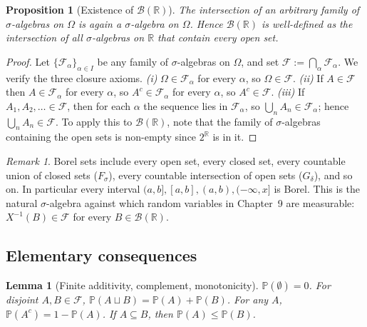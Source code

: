 \documentclass[11pt]{article}
\newtheorem{lemma}[theorem]{Lemma}
\newtheorem{proposition}[theorem]{Proposition}
\theoremstyle{remark}
\newtheorem{remark}[theorem]{Remark}
\begin{document}
\begin{proposition}[Existence of $\mathcal{B}(\mathbb{R})$]
\label{prop:borel-exists}
The intersection of an arbitrary family of $\sigma$-algebras on $\Omega$ is again a $\sigma$-algebra on $\Omega$. Hence $\mathcal{B}(\mathbb{R})$ is well-defined as the intersection of all $\sigma$-algebras on $\mathbb{R}$ that contain every open set.
\end{proposition}

\begin{proof}
Let $\{\mathcal{F}_\alpha\}_{\alpha \in I}$ be any family of $\sigma$-algebras on $\Omega$, and set $\mathcal{F} := \bigcap_{\alpha} \mathcal{F}_\alpha$. We verify the three closure axioms. \emph{(i)} $\Omega \in \mathcal{F}_\alpha$ for every $\alpha$, so $\Omega \in \mathcal{F}$. \emph{(ii)} If $A \in \mathcal{F}$ then $A \in \mathcal{F}_\alpha$ for every $\alpha$, so $A^c \in \mathcal{F}_\alpha$ for every $\alpha$, so $A^c \in \mathcal{F}$. \emph{(iii)} If $A_1, A_2, \ldots \in \mathcal{F}$, then for each $\alpha$ the sequence lies in $\mathcal{F}_\alpha$, so $\bigcup_n A_n \in \mathcal{F}_\alpha$; hence $\bigcup_n A_n \in \mathcal{F}$. To apply this to $\mathcal{B}(\mathbb{R})$, note that the family of $\sigma$-algebras containing the open sets is non-empty since $2^\mathbb{R}$ is in it.
\end{proof}

\begin{remark}
Borel sets include every open set, every closed set, every countable union of closed sets ($F_\sigma$), every countable intersection of open sets ($G_\delta$), and so on. In particular every interval $(a, b], [a, b], (a, b), (-\infty, x]$ is Borel. This is the natural $\sigma$-algebra against which random variables in Chapter~9 are measurable: $X^{-1}(B) \in \mathcal{F}$ for every $B \in \mathcal{B}(\mathbb{R})$.
\end{remark}

\subsection*{Elementary consequences}

\begin{lemma}[Finite additivity, complement, monotonicity]
\label{lem:basic}
$\mathbb{P}(\emptyset) = 0$. For disjoint $A, B \in \mathcal{F}$, $\mathbb{P}(A \sqcup B) = \mathbb{P}(A) + \mathbb{P}(B)$. For any $A$, $\mathbb{P}(A^{c}) = 1 - \mathbb{P}(A)$. If $A \subseteq B$, then $\mathbb{P}(A) \leq \mathbb{P}(B)$.
\end{lemma}
\end{document}
